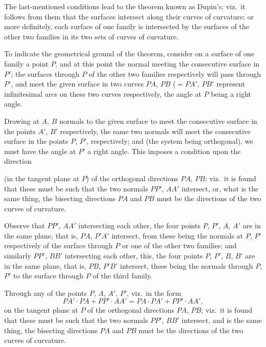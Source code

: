 \documentclass[11pt,a4paper]{book}
\begin{document}
The last-mentioned conditions lead to the theorem known as Dupin's; viz.\ it
follows from them that the surfaces intersect along their curves of curvature; or more
definitely, each surface of one family is intersected by the surfaces of the other two
families in its two sets of curves of curvature.

To indicate the geometrical ground of the theorem, consider on a surface of one
family a point $P$, and at this point the normal meeting the consecutive surface in $P'$;
the surfaces through $P$ of the other two families respectively will pass through $P'$,
and meet the given surface in two curves $PA$, $PB$ ($= PA'$, $PB'$ represent infinitesimal
arcs on these two curves respectively, the angle at $P$ being a right angle.

Drawing at $A$, $B$ normals to the given surface to meet the consecutive surface
in the points $A'$, $B'$ respectively, the same two normals will meet the consecutive
surface in the points $P$, $P'$, respectively; and (the system being orthogonal), we
must have the angle at $P'$ a right angle. This imposes a condition upon the direction

\clearpage

\noindent
(in the tangent plane at $P$) of the orthogonal directions $PA$, $PB$; viz.\ it is found
that these must be such that the two normals $PP'$, $AA'$ intersect, or, what is the same
thing, the bisecting directions $PA$ and $PB$ must be the directions of the two curves of curvature.

Observe that $PP'$, $AA'$ intersecting each other, the four points $P$, $P'$, $A$, $A'$ are
in the same plane, that is, $PA$, $P'A'$ intersect, from these being the normals at $P$, $P'$
respectively of the surface through $P$ or one of the other two families; and similarly
$PP'$, $BB'$ intersecting each other, this, the four points $P$, $P'$, $B$, $B'$ are in
the same plane, that is, $PB$, $P'B'$ intersect, these being the normals through $P$, $P'$ to
the surface through $P$ of the third family.

Through any of the points $P$, $A$, $A'$, $P'$, viz.\ in the form
\[
PA' \cdot PA + PP' \cdot AA' = PA \cdot PA' + PP' \cdot AA',
\]
on the tangent plane at $P$ of the orthogonal directions $PA$, $PB$; viz.\ it is found
that these must be such that the two normals $PP'$, $BB'$ intersect, and is the same
thing, the bisecting directions $PA$ and $PB$ must be the directions of the two curves
of curvature.
\end{document}
